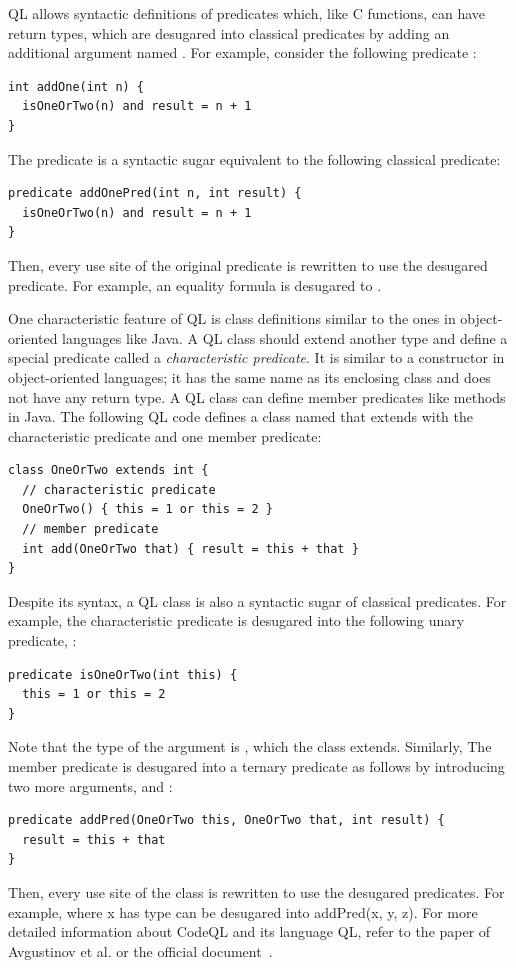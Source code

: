 QL allows syntactic definitions of predicates which, like C functions,
can have return types, which are desugared into classical predicates
by adding an additional argument named .
For example, consider the following predicate :

\begin{lstlisting}[style=codeql,xleftmargin=2.5em]
int addOne(int n) {
  isOneOrTwo(n) and result = n + 1
}
\end{lstlisting}
\noindent
The predicate is a syntactic sugar equivalent to the following classical predicate:
\begin{lstlisting}[style=codeql,xleftmargin=2.5em]
predicate addOnePred(int n, int result) {
  isOneOrTwo(n) and result = n + 1
}
\end{lstlisting}
\noindent
Then, every use site of the original predicate is rewritten to
use the desugared predicate.
For example, an equality formula  is desugared
to .

One characteristic feature of QL is class definitions similar to the ones in object-oriented
languages like Java. A QL class should extend another type
and define a special predicate called a {\it characteristic predicate}.
It is similar to a constructor in object-oriented languages;
it has the same name as its enclosing class and does not have any return type.
A QL class can define member predicates like methods in Java.
The following QL code defines a class named  that extends 
with the characteristic predicate and one member predicate:
\begin{lstlisting}[style=codeql,xleftmargin=2.5em]
class OneOrTwo extends int {
  // characteristic predicate
  OneOrTwo() { this = 1 or this = 2 }
  // member predicate
  int add(OneOrTwo that) { result = this + that }
}
\end{lstlisting}
\noindent

Despite its syntax, a QL class is also a syntactic sugar of classical
predicates.  For example, the characteristic predicate  is
desugared into the following unary predicate, :
\begin{lstlisting}[style=codeql,xleftmargin=2.5em]
predicate isOneOrTwo(int this) {
  this = 1 or this = 2
}
\end{lstlisting}
\noindent
Note that the type of the argument  is , which the class 
extends. Similarly, The member predicate  is desugared into a ternary predicate
as follows by introducing two more arguments,  and :
\begin{lstlisting}[style=codeql,xleftmargin=2.5em]
predicate addPred(OneOrTwo this, OneOrTwo that, int result) {
  result = this + that
}
\end{lstlisting}
Then, every use site of the class is rewritten to use the desugared predicates.
For example,  where x has type 
can be desugared into addPred(x, y, z).
For more detailed information about CodeQL and its language QL, refer to the paper of Avgustinov et
al.\cite{ql2016} or the official document~\cite{codeql}.

